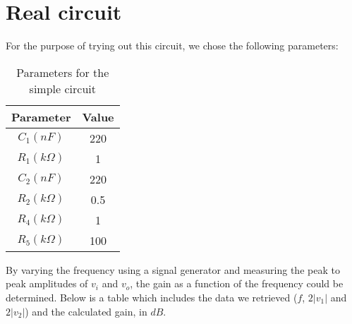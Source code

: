 \newpage

\section{Real circuit}
\label{sec:laboratory}

For the purpose of trying out this circuit, we chose the following parameters:

\begin{table}[H]
\centering
\begin{tabular}{|c|c|}
        \hline
        Parameter & Value \\
        \hline
        $C_1 (nF)$ & 220 \\
        $R_1 (k\Omega)$ & 1 \\
        $C_2 (nF)$ & 220 \\
        $R_2 (k\Omega)$ & 0.5 \\
        $R_4 (k\Omega)$ & 1 \\
        $R_5 (k\Omega)$ & 100 \\
        \hline
\end{tabular}
\caption{Parameters for the simple circuit}
\label{simple_par}
\end{table}

By varying the frequency using a signal generator and measuring the peak to peak amplitudes of $v_i$ and $v_o$, the gain as a function of the frequency could be determined. Below is a table which includes the data we retrieved ($f$, $2|v_1|$ and $2|v_2|$) and the calculated gain, in $dB$.

